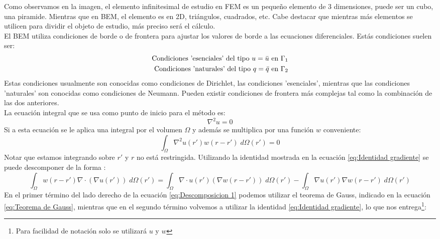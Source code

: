 Como observamos en la imagen, el elemento infinitesimal de estudio en FEM es un pequeño elemento de 3 dimensiones, puede ser un cubo, una piramide. Mientras que en BEM, el elemento es en 2D, triángulos, cuadrados, etc. Cabe destacar que mientras más elementos se utilicen para dividir el objeto de estudio, más preciso será el cálculo.\\
El BEM utiliza condiciones de borde o de frontera para ajustar los valores de borde a las ecuaciones diferenciales. Estás condiciones suelen ser:
\begin{equation}
\label{eq:Condiciones iniciales}
\begin{split}
\textnormal{Condiciones 'esenciales' del tipo }u=\bar{u}\textnormal{ en }\Gamma_1\\
\textnormal{Condiciones 'naturales' del tipo }q=\bar{q}\textnormal{ en }\Gamma_2
\end{split}
\end{equation}
Estas condiciones usualmente son conocidas como condiciones de Dirichlet, las condiciones 'esenciales', mientras que las condiciones 'naturales' son conocidas como condiciones de Neumann. Pueden existir condiciones de frontera más complejas tal como la combinación de las dos anteriores.\\
La ecuación integral que se usa como punto de inicio para el método es:
\begin{equation}
\label{eq:Ecuacion inicial BEM}
\nabla^2u=0
\end{equation}
Si a esta ecuación se le aplica una integral por el volumen $\Omega$ y además se multiplica por una función $w$ conveniente:
\begin{equation}
\int_\Omega\nabla^2u(r')w(r-r')\;d\Omega(r')=0
\end{equation}
Notar que estamos integrando sobre $r'$ y $r$ no está restringida. Utilizando la identidad mostrada en la ecuación \eqref{eq:Identidad gradiente} se puede descomponer de la forma :
\begin{equation}
\label{eq:Descomposicion 1}
\int_\Omega w(r-r')\nabla\cdot(\nabla u(r'))\;d\Omega(r')=\int_\Omega\nabla\cdot u(r')(\nabla w(r-r'))\;d\Omega(r')-\int_\Omega\nabla u(r')\nabla w(r-r')\;d\Omega(r')
\end{equation}
En el primer término del lado derecho de la ecuación \eqref{eq:Descomposicion 1} podemos utilizar el teorema de Gauss, indicado en la ecuación \eqref{eq:Teorema de Gauss}, mientras que en el segundo término volvemos a utilizar la identidad \eqref{eq:Identidad gradiente}, lo que nos entrega\footnote{Para facilidad de notación solo se utilizará $u$ y $w$}:
